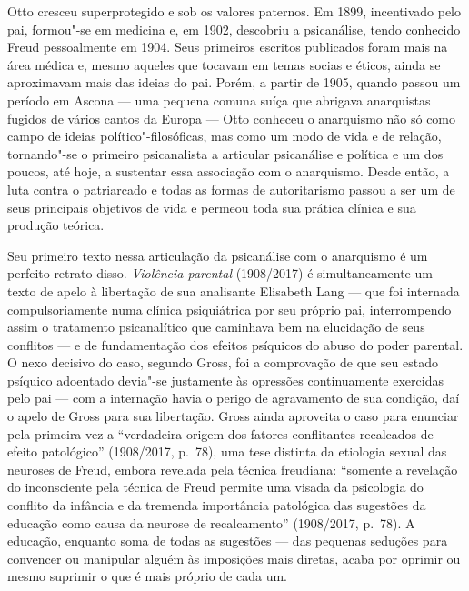Otto cresceu superprotegido e sob os valores paternos. Em 1899,
incentivado pelo pai, formou"-se em medicina e, em 1902, descobriu a
psicanálise, tendo conhecido Freud pessoalmente em 1904. Seus primeiros
escritos publicados foram mais na área médica e, mesmo aqueles que
tocavam em temas socias e éticos, ainda se aproximavam mais das ideias
do pai. Porém, a partir de 1905, quando passou um período em Ascona ---
uma pequena comuna suíça que abrigava anarquistas fugidos de vários
cantos da Europa --- Otto conheceu o anarquismo não só como campo de
ideias político"-filosóficas, mas como um modo de vida e de relação,
tornando"-se o primeiro psicanalista a articular psicanálise e política e
um dos poucos, até hoje, a sustentar essa associação com o anarquismo.
Desde então, a luta contra o patriarcado e todas as formas de
autoritarismo passou a ser um de seus principais objetivos de vida e
permeou toda sua prática clínica e sua produção teórica.

Seu primeiro texto nessa articulação da psicanálise com o anarquismo é
um perfeito retrato disso. \emph{Violência parental} (1908/2017) é simultaneamente
um texto de apelo à libertação de sua analisante Elisabeth Lang --- que
foi internada compulsoriamente numa clínica psiquiátrica por seu próprio
pai, interrompendo assim o tratamento psicanalítico que caminhava bem na
elucidação de seus conflitos --- e de fundamentação dos efeitos psíquicos
do abuso do poder parental. O nexo decisivo do caso, segundo Gross, foi
a comprovação de que seu estado psíquico adoentado devia"-se justamente
às opressões continuamente exercidas pelo pai --- com a internação havia
o perigo de agravamento de sua condição, daí o apelo de Gross para sua
libertação. Gross ainda aproveita o caso para enunciar pela primeira vez
a ``verdadeira origem dos fatores conflitantes recalcados de efeito
patológico'' (1908/2017, p.~78), uma tese distinta da etiologia sexual das neuroses de
Freud, embora revelada pela técnica freudiana: ``somente a revelação do
inconsciente pela técnica de Freud permite uma visada da psicologia do
conflito da infância e da tremenda importância patológica das sugestões
da educação como causa da neurose de recalcamento'' (1908/2017, p.~78). A
educação, enquanto soma de todas as sugestões --- das pequenas seduções
para convencer ou manipular alguém às imposições mais diretas, acaba por
oprimir ou mesmo suprimir o que é mais próprio de cada um.

